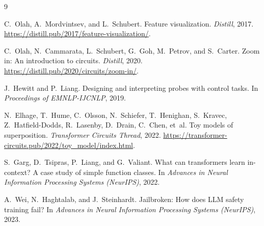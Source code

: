 \documentclass[11pt]{article}
\begin{document}

\begin{thebibliography}{9}

C.~Olah, A.~Mordvintsev, and L.~Schubert.
\newblock Feature visualization.
\newblock \emph{Distill}, 2017.
\newblock \url{https://distill.pub/2017/feature-visualization/}.

C.~Olah, N.~Cammarata, L.~Schubert, G.~Goh, M.~Petrov, and S.~Carter.
\newblock Zoom in: An introduction to circuits.
\newblock \emph{Distill}, 2020.
\newblock \url{https://distill.pub/2020/circuits/zoom-in/}.

J.~Hewitt and P.~Liang.
\newblock Designing and interpreting probes with control tasks.
\newblock In \emph{Proceedings of EMNLP-IJCNLP}, 2019.

N.~Elhage, T.~Hume, C.~Olsson, N.~Schiefer, T.~Henighan, S.~Kravec,
  Z.~Hatfield-Dodds, R.~Lasenby, D.~Drain, C.~Chen, et~al.
\newblock Toy models of superposition.
\newblock \emph{Transformer Circuits Thread}, 2022.
\newblock \url{https://transformer-circuits.pub/2022/toy_model/index.html}.

S.~Garg, D.~Tsipras, P.~Liang, and G.~Valiant.
\newblock What can transformers learn in-context? A case study of simple
  function classes.
\newblock In \emph{Advances in Neural Information Processing Systems (NeurIPS)},
  2022.

A.~Wei, N.~Haghtalab, and J.~Steinhardt.
\newblock Jailbroken: How does LLM safety training fail?
\newblock In \emph{Advances in Neural Information Processing Systems (NeurIPS)},
  2023.

\end{thebibliography}
\end{document}
